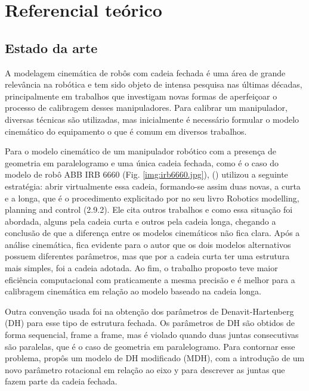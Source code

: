 
\chapter{Referencial teórico}

\section{Estado da arte}

A modelagem cinemática de robôs com cadeia fechada é uma área de grande relevância na robótica e tem sido objeto de intensa pesquisa nas últimas décadas, principalmente em trabalhos que investigam novas formas de aperfeiçoar o processo de calibragem desses manipuladores. Para calibrar um manipulador, diversas técnicas são utilizadas, mas inicialmente é necessário formular o modelo cinemático do equipamento o que é comum em diversos trabalhos.

Para o modelo cinemático de um manipulador robótico com a presença de geometria em paralelogramo e uma única cadeia fechada, como é o caso do modelo de robô ABB IRB 6660 (Fig. \ref{img:irb6660.jpg}),  (\citeyear{peng2019}) utilizou a seguinte estratégia: abrir virtualmente essa cadeia, formando-se assim duas novas, a curta e a longa, que é o procedimento explicitado por  no seu livro Robotics modelling, planning and control (2.9.2). Ele cita outros trabalhos e como essa situação foi abordada, alguns pela cadeia curta e outros pela cadeia longa, chegando a conclusão de que a diferença entre os modelos cinemáticos não fica clara. Após a análise cinemática, fica evidente para o autor que os dois modelos alternativos possuem diferentes parâmetros, mas que por a cadeia curta ter uma estrutura mais simples, foi a cadeia adotada. Ao fim, o trabalho proposto teve maior eficiência computacional com praticamente a mesma precisão e é melhor para a calibragem cinemática em relação ao modelo baseado na cadeia longa.


Outra convenção usada foi na obtenção dos parâmetros de Denavit-Hartenberg (DH) para esse tipo de estrutura fechada. Os parâmetros de DH são obtidos de forma sequencial, frame a frame, mas é violado quando duas juntas consecutivas são paralelas, que é o caso de geometria em paralelogramo. Para contornar esse problema,  propôs um modelo de DH modificado (MDH), com a introdução de um novo parâmetro rotacional em relação ao eixo y para descrever as juntas que fazem parte da cadeia fechada.

